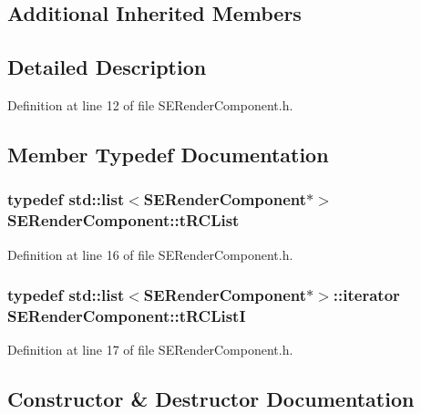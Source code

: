 \subsection*{Additional Inherited Members}


\subsection{Detailed Description}


Definition at line 12 of file S\+E\+Render\+Component.\+h.



\subsection{Member Typedef Documentation}
\subsubsection[{t\+R\+C\+List}]{\setlength{\rightskip}{0pt plus 5cm}typedef std\+::list$<${\bf S\+E\+Render\+Component}$\ast$$>$ {\bf S\+E\+Render\+Component\+::t\+R\+C\+List}}\label{class_s_e_render_component_af848915bfb3304815653b52cb2308a83}


Definition at line 16 of file S\+E\+Render\+Component.\+h.

\subsubsection[{t\+R\+C\+List\+I}]{\setlength{\rightskip}{0pt plus 5cm}typedef std\+::list$<${\bf S\+E\+Render\+Component}$\ast$$>$\+::iterator {\bf S\+E\+Render\+Component\+::t\+R\+C\+List\+I}}\label{class_s_e_render_component_a2a56844c5e9c094553ced401736f75c7}


Definition at line 17 of file S\+E\+Render\+Component.\+h.



\subsection{Constructor \& Destructor Documentation}
